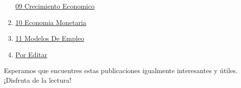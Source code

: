 \documentclass[
  jou,
  floatsintext,
  longtable,
  a4paper,
  nolmodern,
  notxfonts,
  notimes,
  colorlinks=true,linkcolor=blue,citecolor=blue,urlcolor=blue]{apa7}
\begin{document}
\begin{enumerate}
  \href{https://achalmaedison.netlify.app/macroeconomia/posts/2022-01-17-09-crecimiento-economico}{09
  Crecimiento Economico}
\item
  \href{https://achalmaedison.netlify.app/macroeconomia/posts/2022-01-24-10-economia-monetaria/index.pdf}{}
  \href{https://achalmaedison.netlify.app/macroeconomia/posts/2022-01-24-10-economia-monetaria}{10
  Economia Monetaria}
\item
  \href{https://achalmaedison.netlify.app/macroeconomia/posts/2022-01-31-11-modelos-de-empleo/index.pdf}{}
  \href{https://achalmaedison.netlify.app/macroeconomia/posts/2022-01-31-11-modelos-de-empleo}{11
  Modelos De Empleo}
\item
  \href{https://achalmaedison.netlify.app/macroeconomia/posts/2024-03-31-por-editar/index.pdf}{}
  \href{https://achalmaedison.netlify.app/macroeconomia/posts/2024-03-31-por-editar}{Por
  Editar}
\end{enumerate}

Esperamos que encuentres estas publicaciones igualmente interesantes y
útiles. ¡Disfruta de la lectura!
\end{document}
